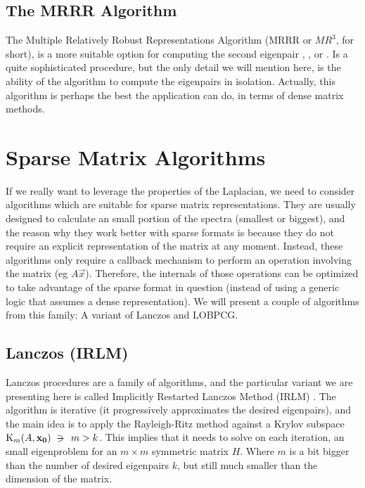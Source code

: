 \subsection{The \gls{MRRR} Algorithm}

The Multiple Relatively Robust Representations Algorithm (\gls{MRRR} or $MR^3$,
for short), is a more suitable option for computing the second
eigenpair \cite{dhillon97},
\cite{dhillon04}, \cite{dhillon06} or \cite{parlett04}. Is a quite
sophisticated procedure, but the only detail we will mention here, is
the ability of the algorithm to compute the eigenpairs in
isolation. Actually, this algorithm is perhaps the best 
the application can do, in terms of dense matrix methods.


\section{Sparse Matrix Algorithms}

If we really want to leverage the properties of the \gls{Laplacian}, we need
to consider algorithms which are suitable for sparse matrix
representations. They are usually designed to calculate an small
portion of the spectra (smallest or biggest), and the reason why they
work better with sparse formats is because they do not require
an explicit representation of the matrix at any moment. Instead, these
algorithms only require a callback mechanism to perform an operation
involving the matrix (eg $A\vec{x}$). Therefore, the internals of
those operations can be optimized to take advantage of the sparse
format in question (instead of using a generic logic that assumes a
dense representation). We will present a couple of algorithms from
this family: A variant of Lanczos and LOBPCG.

\subsection{Lanczos (\gls{IRLM})}
\label{sub:irlm}

Lanczos procedures are a family of algorithms, and the particular
variant we are presenting here is called Implicitly Restarted Lanczos
Method (\gls{IRLM}) \cite{arpack}. The algorithm is iterative (it
progressively approximates the 
desired eigenpairs), and the main idea is to apply the Rayleigh-Ritz
method against a Krylov subspace $\Krylov{A}{\vec{x_0}}{m} \suchthat m
> k$. This implies that it needs to solve on each iteration, an small
eigenproblem for an $m \times m$ symmetric matrix $H$. Where $m$ is a bit bigger
than the number of desired eigenpairs $k$, but still much smaller than the
dimension of the matrix. \\

